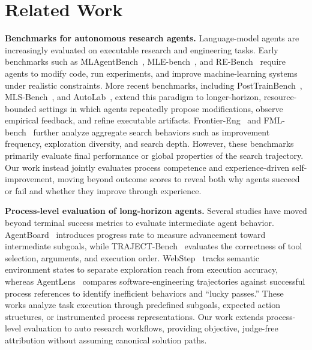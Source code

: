 \section{Related Work}

\textbf{Benchmarks for autonomous research agents.}
Language-model agents are increasingly evaluated on executable research and engineering tasks. 
Early benchmarks such as MLAgentBench~\citep{MLAgentBench2024Huang}, MLE-bench~\citep{chan2025mlebench}, and RE-Bench~\citep{REbench2025Wijk} require agents to modify code, run experiments, and improve machine-learning systems under realistic constraints. 
More recent benchmarks, including PostTrainBench~\citep{posttrainbench_2026}, MLS-Bench~\citep{lyu2026mlsbench}, and AutoLab~\citep{xu2026autolab}, extend this paradigm to longer-horizon, resource-bounded settings in which agents repeatedly propose modifications, observe empirical feedback, and refine executable artifacts. 
Frontier-Eng~\citep{chi2026frontiereng} and FML-bench~\citep{zou2026fmlbench} further analyze aggregate search behaviors such as improvement frequency, exploration diversity, and search depth. However, these benchmarks primarily evaluate final performance or global properties of the search trajectory. 
Our work instead jointly evaluates process competence and experience-driven self-improvement, moving beyond outcome scores to reveal both why agents succeed or fail and whether they improve through experience.

\textbf{Process-level evaluation of long-horizon agents.}
Several studies have moved beyond terminal success metrics to evaluate intermediate agent behavior. 
AgentBoard~\citep{AgentBoard2024Ma} introduces progress rate to measure advancement toward intermediate subgoals, while TRAJECT-Bench~\citep{he2026trajectbench} evaluates the correctness of tool selection, arguments, and execution order. 
WebStep~\citep{chung2026webstep} tracks semantic environment states to separate exploration reach from execution accuracy, whereas AgentLens~\citep{sahoo2026agentlens} compares software-engineering trajectories against successful process references to identify inefficient behaviors and ``lucky passes.'' 
These works analyze task execution through predefined subgoals, expected action structures, or instrumented process representations. 
Our work extends process-level evaluation to auto research workflows, providing objective, judge-free attribution without assuming canonical solution paths.

